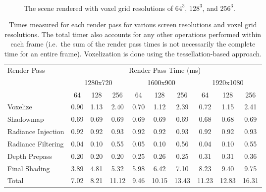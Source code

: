 \begin{figure}
\centering
\begin{subfigure}[t]{0.475\textwidth}
    \caption{}
\end{subfigure}
~
\begin{subfigure}[t]{0.475\textwidth}
    \caption{}
\end{subfigure}

\begin{subfigure}[t]{0.475\textwidth}
    \caption{}
\end{subfigure}
\caption{The scene rendered with voxel grid resolutions of $64^3$, $128^3$, and $256^3$.}
\label{fig:results_rendered}
\end{figure}

\begin{table}
\centering
\small
\begin{tabular}{l ccc ccc ccc}
\toprule
Render Pass & \multicolumn{9}{c}{Render Pass Time (ms)} \\
& \multicolumn{3}{c}{1280x720} & \multicolumn{3}{c}{1600x900} & \multicolumn{3}{c}{1920x1080} \\
& 64 & 128 & 256 & 64 & 128 & 256 & 64 & 128 & 256 \\
\midrule
Voxelize           & 0.90 & 1.13 & 2.40  & 0.70 & 1.12 & 2.39  & 0.72 & 1.15 & 2.41\\
Shadowmap          & 0.69 & 0.69 & 0.69  & 0.69 & 0.69 & 0.69  & 0.68 & 0.68 & 0.69\\
Radiance Injection & 0.92 & 0.92 & 0.93  & 0.92 & 0.92 & 0.93  & 0.92 & 0.92 & 0.93\\
Radiance Filtering & 0.04 & 0.10 & 0.55  & 0.05 & 0.10 & 0.56  & 0.04 & 0.10 & 0.55\\
Depth Prepass      & 0.20 & 0.20 & 0.20  & 0.25 & 0.26 & 0.25  & 0.31 & 0.31 & 0.36\\
Final Shading      & 3.89 & 4.81 & 5.32  & 5.98 & 6.42 & 7.10  & 8.23 & 9.40 & 9.75\\
\midrule
Total              & 7.02 & 8.21 & 11.12  & 9.46 & 10.15 & 13.43  & 11.23 & 12.83 & 16.31\\
\bottomrule
\end{tabular}
\caption{Times measured for each render pass for various screen resolutions and voxel grid resolutions. The total timer also accounts for any other operations performed within each frame (i.e.\ the sum of the render pass times is not necessarily the complete time for an entire frame). Voxelization is done using the tessellation-based approach.}
\label{tbl:renderpasstiming}
\end{table}

